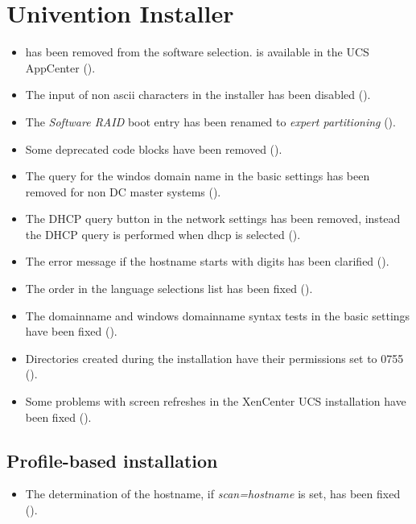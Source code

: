 \section{Univention Installer}
\begin{itemize}

\item {} has been removed from the software
selection.  is available in the UCS AppCenter
(). 

\item The input of non ascii characters in the installer has been disabled
().

\item The \emph{Software RAID} boot entry has been renamed to \emph{expert
partitioning} ().

\item Some deprecated code blocks have been removed ().

\item The query for the windos domain name in the basic settings has been
removed for non DC master systems ().

\item The DHCP query button in the network settings has been removed, instead
the DHCP query is performed when dhcp is selected ().

\item The error message if the hostname starts with digits has been clarified
().

\item The order in the language selections list has been fixed
().

\item The domainname and windows domainname syntax tests in the basic settings
have been fixed ().

\item Directories created during the installation have their permissions set
to 0755 ().

\item Some problems with screen refreshes in the XenCenter UCS installation
have been fixed ().

\end{itemize}

\subsection{Profile-based installation}
\begin{itemize}

\item The determination of the hostname, if
\emph{scan=hostname} is set, has been fixed
().

\end{itemize}


